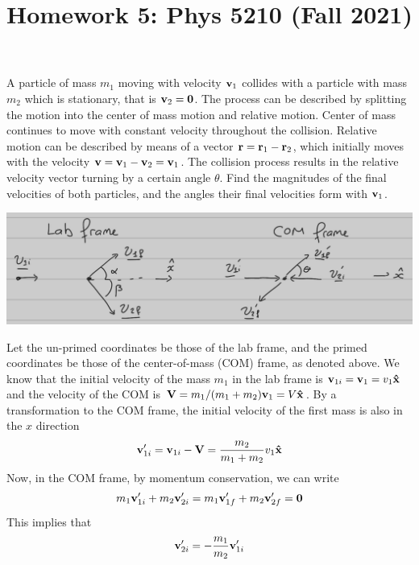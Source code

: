 \documentclass[12pt]{article}
\title{Homework 5: Phys 5210 (Fall 2021)}
\begin{document}
\maketitle
\begin{problem}{1}
A particle of mass $m_1$ moving with velocity $\vb{v}_1$ collides with a
particle with mass $m_2$ which is stationary, that is $\vb{v}_2=\vb{0}$. The
process can be described by splitting the motion into the center of mass motion
and relative motion. Center of mass continues to move with constant velocity
throughout the collision. Relative motion can be described by means of a vector
$\vb{r}=\vb{r}_1-\vb{r}_2$, which initially moves with the velocity
$\vb{v}=\vb{v}_1-\vb{v}_2=\vb{v}_1$. The collision process results in the
relative velocity vector turning by a certain angle $\theta$. Find the
magnitudes of the final velocities of both particles, and the angles their final
velocities form with $\vb{v}_1$.
\begin{solution}
\begin{center}
    \includegraphics[width=1\textwidth]{hw5_p1.jpg} 
\end{center}
Let the un-primed coordinates be those of the lab frame, and the primed
coordinates be those of the center-of-mass (COM) frame, as denoted above. We 
know that the initial velocity of the mass $m_1$ in the lab frame is
$\vb{v}_{1i}=\vb{v}_1=v_1\vb{\hat{x}}$ and the velocity of the COM is
$\vb{V}=m_1 /(m_1+m_2)\vb{v}_{1}=V\vb{\hat{x}}$. By a transformation to the COM frame,
the initial velocity of the first mass is also in the $x$ direction
\begin{equation}\label{p1:v1ip}
    \vb{v}_{1i}'=\vb{v}_{1i}-\vb{V}=\frac{m_2}{m_1+m_2}v_1\vb{\hat{x}}
\end{equation}
Now, in the COM frame, by momentum conservation, we can write
\begin{equation}
    m_1\vb{v}_{1i}'+m_2\vb{v}_{2i}'=m_1\vb{v}_{1f}'+m_2\vb{v}_{2f}'=\vb{0}
\end{equation}
This implies that
\begin{equation}\label{p1:2vs1}
    \vb{v}_{2i}'=-\frac{m_1}{m_2}\vb{v}_{1i}'

\end{equation}
\end{solution}
\end{problem}
\end{document}
